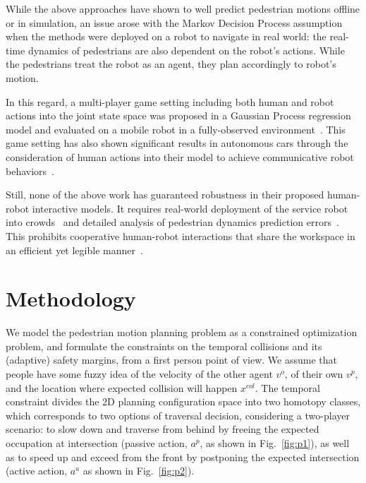 \documentclass[conference]{IEEEtran}
\begin{document}
While the above approaches have shown to well predict pedestrian motions 
offline or in simulation, an issue arose with the Markov Decision 
Process assumption when the methods were deployed on a robot to navigate in real world:
the real-time dynamics of pedestrians are also dependent on the robot's 
actions. While the pedestrians treat the robot as an agent, they plan 
accordingly to robot's motion. 

In this regard, a multi-player game setting including both human and robot actions into the joint state space was proposed in a Gaussian Process regression model and evaluated on a mobile robot in a fully-observed environment~\cite{trautman2010unfreezing}. This game setting has also shown significant results in autonomous cars through the consideration of human actions into their model to achieve communicative robot behaviors~\cite{sadigh2016planning}.

Still, none of the above work has guaranteed robustness in their proposed 
human-robot interactive models. It requires real-world 
deployment of the service robot into crowds~\cite{trautman2015robot} and 
detailed analysis of pedestrian dynamics prediction 
errors~\cite{pfeiffer2016predicting}. This prohibits cooperative human-robot 
interactions that share the workspace in an efficient yet legible manner~\cite{dragan2013legibility}.
\section{Methodology}
We model the pedestrian motion planning problem as a constrained optimization 
problem, and formulate the constraints on the temporal collisions and its 
(adaptive) safety margins, from a first person point of view. We assume that 
people have some fuzzy idea of the velocity of the other agent $v^o$, of their 
own $v^p$, and the location where expected collision will happen $x^{col}$. 
The temporal constraint divides the 2D planning configuration space into two 
homotopy classes, which corresponds to two options of traversal decision, 
considering a two-player scenario: to slow down and traverse from behind by 
freeing the expected occupation at intersection (passive action, $a^{p}$, as 
shown in Fig.~\ref{fig:p1}), as well as to speed up and exceed from the front by postponing 
the expected intersection (active action, $a^a$ as shown in Fig.~\ref{fig:p2}).   
\end{document}
